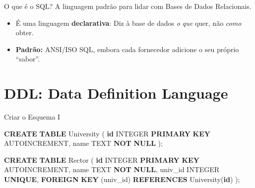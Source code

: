\documentclass[
  ignorenonframetext,
]{beamer}
\newenvironment{Shaded}{}{}
\newcommand{\DataTypeTok}[1]{\textcolor[rgb]{0.56,0.13,0.00}{#1}}
\newcommand{\KeywordTok}[1]{\textcolor[rgb]{0.00,0.44,0.13}{\textbf{#1}}}
\newcommand{\NormalTok}[1]{#1}
\providecommand{\tightlist}{%
  \setlength{\itemsep}{0pt}\setlength{\parskip}{0pt}}
\begin{document}
\begin{frame}{O que é o SQL?}
\protect{}\label{o-que-uxe9-o-sql}
A linguagem padrão para lidar com Bases de Dados Relacionais.

\begin{itemize}
\tightlist
\item
  É uma linguagem \textbf{declarativa}: Diz à base de dados \emph{o que}
  quer, não \emph{como} obter.
\item
  \textbf{Padrão:} ANSI/ISO SQL, embora cada fornecedor adicione o seu
  próprio ``sabor''.
\end{itemize}
\end{frame}

\section{DDL: Data Definition
Language}\label{ddl-data-definition-language}

\begin{frame}[fragile]{Criar o Esquema I}
\protect{}\label{criar-o-esquema-i}
\begin{Shaded}
\begin{Highlighting}[]
\KeywordTok{CREATE} \KeywordTok{TABLE}\NormalTok{ University (}
    \KeywordTok{id} \DataTypeTok{INTEGER} \KeywordTok{PRIMARY} \KeywordTok{KEY}\NormalTok{ AUTOINCREMENT,}
\NormalTok{    name TEXT }\KeywordTok{NOT} \KeywordTok{NULL}
\NormalTok{);}

\KeywordTok{CREATE} \KeywordTok{TABLE}\NormalTok{ Rector (}
    \KeywordTok{id} \DataTypeTok{INTEGER} \KeywordTok{PRIMARY} \KeywordTok{KEY}\NormalTok{ AUTOINCREMENT,}
\NormalTok{    name TEXT }\KeywordTok{NOT} \KeywordTok{NULL}\NormalTok{,}
\NormalTok{    univ\_id }\DataTypeTok{INTEGER} \KeywordTok{UNIQUE}\NormalTok{,}
    \KeywordTok{FOREIGN} \KeywordTok{KEY}\NormalTok{ (univ\_id) }\KeywordTok{REFERENCES}\NormalTok{ University(}\KeywordTok{id}\NormalTok{)}
\NormalTok{);}
\end{Highlighting}
\end{Shaded}
\end{frame}
\end{document}
